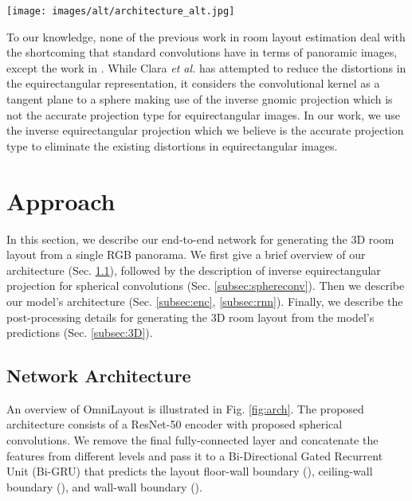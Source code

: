 \documentclass[final]{cvpr}
\begin{document}
\begin{figure*}[!t]
    \centering
    \texttt{[image: images/alt/architecture\_alt.jpg]}
    \caption{\textbf{OmniLayout architecture:} Our model is built on ResNet followed by Bi-Directional GRU that predicts the positions of corners of the room. We have replaced the standard convolution from each block of ResNet with the sphere convolution (inverse equirectangular projection). The output of the network is a 1D representation map of shape . Since the width of the panorama is 1024 the output map has 3 values per column:  (ceiling-wall),  (floor-wall) and  (wall-wall / corners).}
    \label{fig:arch}
\end{figure*}


To our knowledge, none of the previous work in room layout estimation deal with the shortcoming that standard convolutions have in terms of panoramic images, except the work in \cite{fernandez2020corners}. While Clara \textit{et al.} \cite{fernandez2020corners} has attempted to reduce the distortions in the equirectangular representation, it considers the convolutional kernel as a tangent plane to a sphere making use of the inverse gnomic projection which is not the accurate projection type for equirectangular images. In our work, we use the inverse equirectangular projection which we believe is the accurate projection type to eliminate the existing distortions in equirectangular images.   



\section{Approach}\label{sec:app}



In this section, we describe our end-to-end network for generating the 3D room layout from a single RGB panorama. We first give a brief overview of our architecture (Sec. \ref{subsec:brief}), followed by the description of inverse equirectangular projection for spherical convolutions (Sec. \ref{subsec:sphereconv}). Then we describe our model's architecture (Sec. \ref{subsec:enc}, \ref{subsec:rnn}). Finally, we describe the post-processing details for generating the 3D room layout from the model's predictions (Sec. \ref{subsec:3D}).

\subsection{Network Architecture}\label{subsec:brief}
An overview of OmniLayout is illustrated in Fig. \ref{fig:arch}. The proposed architecture consists of a ResNet-50 \cite{he2016deep} encoder with proposed spherical convolutions. We remove the final fully-connected layer and concatenate the features from different levels and pass it to a Bi-Directional Gated Recurrent Unit (Bi-GRU) \cite{chung2014empirical} that predicts the layout floor-wall boundary (), ceiling-wall boundary (), and wall-wall boundary ().
\end{document}
